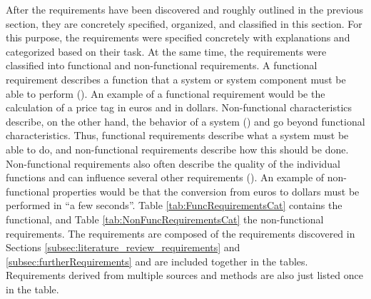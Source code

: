 After the requirements have been discovered and roughly outlined in the previous section, they are concretely specified, organized, and classified in this section. For this purpose, the requirements were specified concretely with explanations and categorized based on their task. At the same time, the requirements were classified into functional and non-functional requirements. A functional requirement describes a function that a system or system component must be able to perform (\cite{IEEE.1990}). An example of a functional requirement would be the calculation of a price tag in euros and in dollars. Non-functional characteristics describe, on the other hand, the behavior of a system (\cite{Seacord.2003}) and go beyond functional characteristics. Thus, functional requirements describe what a system must be able to do, and non-functional requirements describe how this should be done. Non-functional requirements also often describe the quality of the individual functions and can influence several other requirements (\cite{Balzert.2011}). An example of non-functional properties would be that the conversion from euros to dollars must be performed in \enquote{a few seconds}. Table \ref{tab:FuncRequirementsCat} contains the functional, and Table \ref{tab:NonFuncRequirementsCat} the non-functional requirements. The requirements are composed of the requirements discovered in Sections \ref{subsec:literature_review_requirements} and \ref{subsec:furtherRequirements} and are included together in the tables. Requirements derived from multiple sources and methods are also just listed once in the table.




